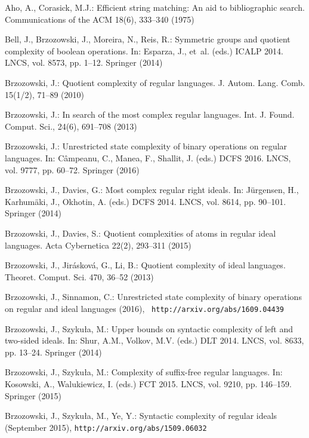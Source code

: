 \documentclass[final]{dmtcs-episciences}
\theoremstyle{definition}
\theoremstyle{remark}
\begin{document}
\begin{thebibliography}{10}
\providecommand{\url}[1]{\texttt{#1}}
\providecommand{\urlprefix}{URL }

Aho, A., Corasick, M.J.: Efficient string matching: An aid to bibliographic
  search. Communications of the ACM  18(6),  333--340 (1975)

Bell, J., Brzozowski, J., Moreira, N., Reis, R.: Symmetric groups and quotient
  complexity of boolean operations. In: Esparza, J., et~al. (eds.) ICALP 2014.
  LNCS, vol. 8573, pp. 1--12. Springer (2014)

Brzozowski, J.: Quotient complexity of regular languages. J. Autom. Lang. Comb.
   15(1/2),  71--89 (2010)

Brzozowski, J.: In search of the most complex regular languages. Int. J. Found.
  Comput. Sci.,  24(6),  691--708 (2013)

Brzozowski, J.: Unrestricted state complexity of binary operations on regular
  languages. In: C{\^a}mpeanu, C., Manea, F., Shallit, J. (eds.) DCFS 2016.
  LNCS, vol. 9777, pp. 60--72. Springer (2016)

Brzozowski, J., Davies, G.: Most complex regular right ideals. In: J\"urgensen,
  H., Karhum\"aki, J., Okhotin, A. (eds.) DCFS 2014. LNCS, vol. 8614, pp.
  90--101. Springer (2014)

Brzozowski, J., Davies, S.: Quotient complexities of atoms in regular ideal
  languages. Acta Cybernetica  22(2),  293--311 (2015)

Brzozowski, J., Jir{\'a}skov{\'a}, G., Li, B.: Quotient complexity of ideal
  languages. Theoret. Comput. Sci.  470,  36--52 (2013)

Brzozowski, J., Sinnamon, C.: Unrestricted state complexity of binary
  operations on regular and ideal languages (2016), {\small\tt
  http://arxiv.org/abs/1609.04439}

Brzozowski, J., Szyku{\l}a, M.: Upper bounds on syntactic complexity of left
  and two-sided ideals. In: Shur, A.M., Volkov, M.V. (eds.) DLT 2014. LNCS,
  vol. 8633, pp. 13--24. Springer (2014)

Brzozowski, J., Szyku{\l}a, M.: Complexity of suffix-free regular languages.
  In: Kosowski, A., Walukiewicz, I. (eds.) FCT 2015. LNCS, vol. 9210, pp.
  146--159. Springer (2015)

Brzozowski, J., Szyku{\l}a, M., Ye, Y.: Syntactic complexity of regular ideals
  (September 2015), {\small\tt http://arxiv.org/abs/1509.06032}


\end{thebibliography}
\end{document}
